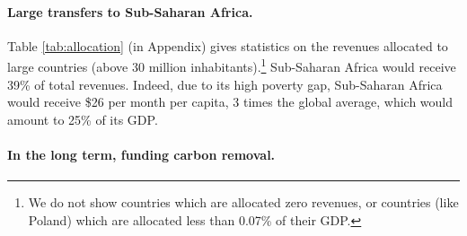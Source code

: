 \documentclass[12pt,english]{article}
\begin{document}
\paragraph{Large transfers to Sub-Saharan Africa.} 
Table \ref{tab:allocation} (in Appendix) gives statistics on the revenues allocated to large countries (above 30 million inhabitants).\footnote{We do not show countries which are allocated zero revenues, or countries (like Poland) which are allocated less than 0.07\% of their GDP.} %
Sub-Saharan Africa would receive 39\% of total revenues.  
Indeed, due to its high poverty gap, Sub-Saharan Africa would receive \$26 per month per capita, 3 times the global average, which would amount to 25\% of its GDP.

\paragraph{In the long term, funding carbon removal.} 
\end{document}
